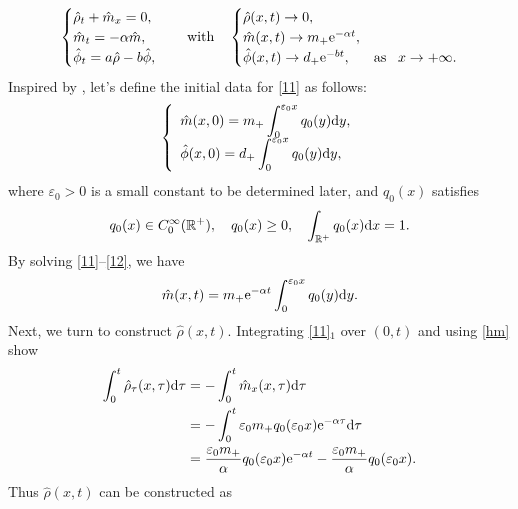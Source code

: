 \documentclass[11pt]{article}
\theoremstyle{plain}
\numberwithin{equation}{section}
\begin{document}
	\begin{equation}\label{11}
		\begin{cases}
\hat\rho_t+\hat m_x=0,     \\
			\hat m_t=-\alpha\hat m, \\
			\hat\phi_t=a\hat\rho-b\hat\phi,
\end{cases}
\quad \text{with} \quad
\begin{cases}
\hat\rho(x,t)\to0,      \\
			\hat m(x,t)\to m_{+}{\rm e}^{-\alpha t},  \\
			\hat\phi(x,t)\to d_{+}{\rm e}^{-bt},  & \mbox{as}\;\;\;x\to+\infty.\\
\end{cases}
	\end{equation}
Inspired by \cite{Nishihara1996, Hsiao-Liu1992}, let's define the initial data for \eqref{11} as follows:
\begin{equation}\label{12}
		\left\{
		\begin{array}{lr}
			\hat m(x,0)=m_+\displaystyle\int_{0}^{\varepsilon_{0}x}q_0(y){\rm d}y, \\[2mm]
			\hat\phi(x,0)=d_+\displaystyle\int_{0}^{\varepsilon_{0}x}q_0(y){\rm d}y,
		\end{array}
		\right.
	\end{equation}
	where $\varepsilon_{0}>0$ is a small constant to be determined later, and $q_0(x)$ satisfies
	\begin{equation} \label{13}
		q_0(x)\in C_{0}^{\infty}(\mathbb{R}^+),~~~q_0(x)\geq0,\;~~\int_{\mathbb{R}^{+}}q_0(x) {\rm d}x=1.
	\end{equation}	
	By solving \eqref{11}--\eqref{12}, we have
	\begin{equation}\label{hm}
		\hat m(x,t)=m_+{\rm e}^{-\alpha t}\displaystyle\int_{0}^{\varepsilon_{0}x}q_0(y){\rm d}y.
	\end{equation}
	Next, we turn to construct $\hat\rho(x,t)$. Integrating  \eqref{11}$_{1}$ over $(0,t)$ and using \eqref{hm} show
	\begin{align*}
		\int_{0}^{t}\hat\rho_{\tau}(x,\tau){\rm d}\tau&=-\int_{0}^{t}\hat m_x(x,\tau){\rm d}\tau\\
		&=-\int_{0}^{t}\varepsilon_{0}m_+q_0(\varepsilon_{0}x){\rm e}^{-\alpha\tau}{\rm d}\tau\\
		&=\frac{\varepsilon_{0}m_+}{\alpha}q_0(\varepsilon_{0}x){\rm e}^{-\alpha t}-\frac{\varepsilon_{0}m_+}{\alpha}q_0(\varepsilon_{0}x).
	\end{align*}
Thus $\hat\rho(x,t)$ can be constructed as
\end{document}
